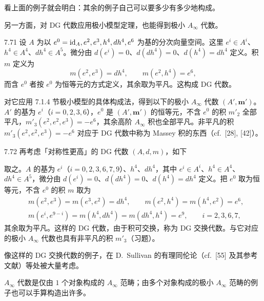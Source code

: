 看上面的例子就会明白：其余的例子自己可以要多少有多少地构成。

另一方面，对 DG 代数应用极小模型定理，也能得到极小 $A_\infty$ 代数。

\begin{example}{7.71}
设 $A$ 为以 $e^{0}=\mathrm{id}_{A},e^{2},e^{3},h^{4},dh^{4},e^{6}$ 为基的分次向量空间。这里 $e^{i}\in A^{i}$、$h^{4}\in A^{4}$、$dh^{4}\in A^{5}$。微分由 $d(e^{i})=0$、$d(dh^{4})=0$、$d(h^{4})=dh^{4}$ 定义。积 $m$ 定义为
\[
  m(e^{2},e^{3})=dh^{4},\qquad m(e^{2},h^{4})=e^{6},
\]
而含 $e^{0}$ 者按 $e^{0}$ 为恒等元的方式定义，其余取为平凡。这构成 DG 代数。

对它应用 7.1.4 节极小模型的具体构成法，得到以下的极小 $A_\infty$ 代数 $(A',\mathbf m')$。$A'$ 的基为 $e^{i}$（$i=0,2,3,6$），$e^{0}$ 是 $(A',\mathbf m')$ 的恒等元，不含 $e^{0}$ 的积 $m'_{2}$ 全部平凡，$m'_{3}(e^{2},e^{2},e^{3})=-e^{6}$，其余高阶 $A_\infty$ 积也全部平凡。非平凡的积 $m'_{3}(e^{2},e^{2},e^{3})=-e^{6}$ 对应于 DG 代数中称为 Massey 积的东西（cf.\ [28], [42]）。
\end{example}


\begin{example}{7.72}
再考虑「对称性更高」的 DG 代数 $(A,d,m)$，如下

取之。$A$ 的基为 $e^{i}$（$i=0,2,3,6,7,9$）、$h^{4}$、$dh^{4}$，其中 $e^{i}\in A^{i}$、$h^{4}\in A^{4}$、$dh^{4}\in A^{5}$，微分由 $d(e^{i})=0$、$d(dh^{4})=0$、$d(h^{4})=dh^{4}$ 定义。把 $e^{0}$ 取为恒等元，不含 $e^{0}$ 的积 $m$ 取为
\begin{align*}
  &m(e^{2},e^{3})=m(e^{3},e^{2})=dh^{4},\qquad m(e^{2},h^{4})=m(h^{4},e^{2})=e^{6},\\
  &m(e^{i},e^{9-i})=m(h^{4},dh^{4})=m(dh^{4},h^{4})=e^{9},\qquad i=2,3,6,7,
\end{align*}
其余取为平凡。这样的 DG 代数，由于积可交换，称为 DG 交换代数。与它对应的极小 $A_\infty$ 代数也具有非平凡的积 $m'_{3}$（习题）。
\end{example}

像这样的 DG 交换代数的例子，在 D.~Sullivan 的有理同伦论（cf.\ [55] 及其参考文献）等处被大量考虑。

$A_\infty$ 代数是仅由 $1$ 个对象构成的 $A_\infty$ 范畴；由多个对象构成的极小 $A_\infty$ 范畴的例子也可以手算构造出许多。

